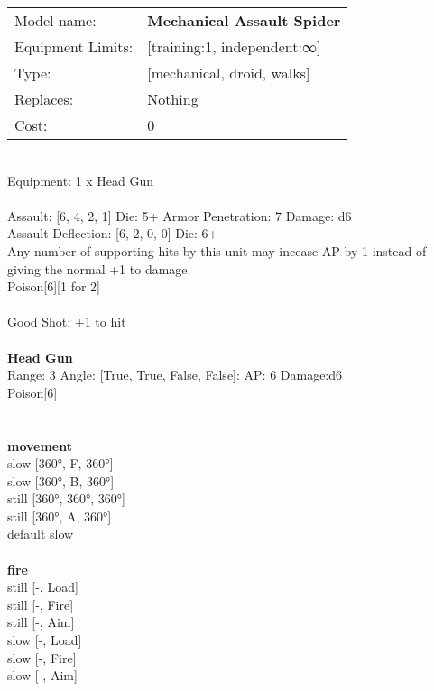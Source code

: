 \noindent 

\noindent
\begin{tabular}{ll}
Model name: &{\bf Mechanical Assault Spider } \\
Equipment Limits: &[training:1, independent:∞] \\
Type: &[mechanical, droid, walks] \\
Replaces: &Nothing \\
Cost: & 0\\
\end{tabular}
\ \\
Equipment: 1 x Head Gun \\
\ \\
Assault: [6, 4, 2, 1] Die: 5+ Armor Penetration: 7 Damage: d6 \\
Assault Deflection: [6, 2, 0, 0] Die: 6+\\
\indent Any number of supporting hits by this unit may incease AP by 1 instead of giving the normal +1 to damage.\\ 
Poison[6][1 for 2]\\ 
 
\ \\
Good Shot: +1 to hit\\ 

\ \\
{\bf Head Gun } \\



Range: 3  Angle: [True, True, False, False]: AP: 6 Damage:d6 \\
Poison[6]\\ 




 
\ \\



\ \\ {\bf movement } \\
slow [360°, F, 360°] \\
slow [360°, B, 360°] \\
still [360°, 360°, 360°] \\
still [360°, A, 360°] \\
default slow \\
\ \\ {\bf fire } \\
still [-, Load] \\
still [-, Fire] \\
still [-, Aim] \\
slow [-, Load] \\
slow [-, Fire] \\
slow [-, Aim] \\


